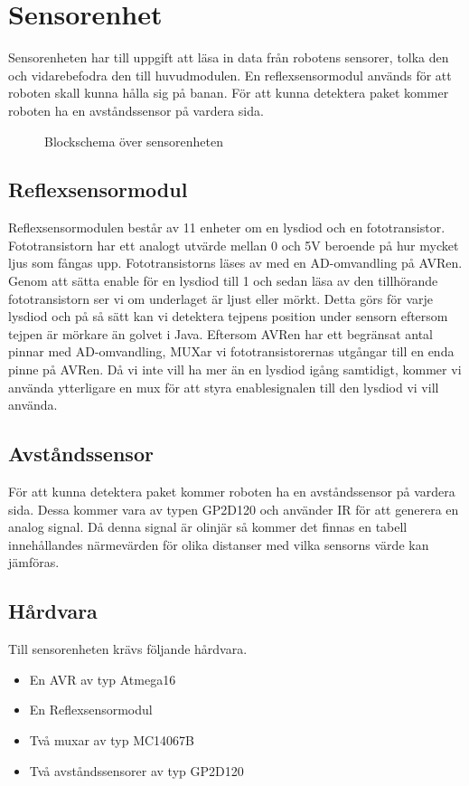 %

\section{Sensorenhet}
Sensorenheten har till uppgift att läsa in data från robotens sensorer, tolka den och vidarebefodra den till huvudmodulen. En reflexsensormodul används för att roboten skall kunna hålla sig på banan. För att kunna detektera paket kommer roboten ha en avståndssensor på vardera sida. \\

\begin{figure}[h]
\center

\caption{Blockschema över sensorenheten}
\end{figure}

\subsection{Reflexsensormodul}
Reflexsensormodulen består av 11 enheter om en lysdiod och en fototransistor. Fototransistorn har ett analogt utvärde mellan 0 och 5V beroende på hur mycket ljus som fångas upp. Fototransistorns läses av med en AD-omvandling på AVRen. Genom att sätta enable för en lysdiod till 1 och sedan läsa av den tillhörande fototransistorn ser vi om underlaget är ljust eller mörkt. Detta görs för varje lysdiod och på så sätt kan vi detektera tejpens position under sensorn eftersom tejpen är mörkare än golvet i Java. Eftersom AVRen har ett begränsat antal pinnar med AD-omvandling, MUXar vi fototransistorernas utgångar till en enda pinne på AVRen. Då vi inte vill ha mer än en lysdiod igång samtidigt, kommer vi använda ytterligare en mux för att styra enablesignalen till den lysdiod vi vill använda.

\subsection{Avståndssensor}
För att kunna detektera paket kommer roboten ha en avståndssensor på vardera sida. Dessa kommer vara av typen GP2D120 och använder IR för att generera en analog signal. Då denna signal är olinjär så kommer det finnas en tabell innehållandes närmevärden för olika distanser med vilka sensorns värde kan jämföras.

\subsection{Hårdvara}
Till sensorenheten krävs följande hårdvara.
\begin{itemize}
\item{En AVR av typ Atmega16}
\item{En Reflexsensormodul}
\item{Två muxar av typ MC14067B}
\item{Två avståndssensorer av typ GP2D120}
\end{itemize}


